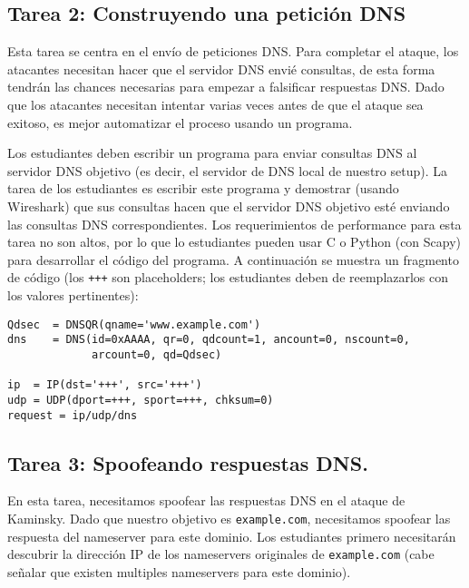 \subsection{Tarea 2: Construyendo una petición DNS} 

Esta tarea se centra en el envío de peticiones DNS.
Para completar el ataque, los atacantes necesitan hacer que el servidor DNS envié consultas, de esta forma tendrán las chances necesarias para empezar a falsificar respuestas DNS. Dado que los atacantes necesitan intentar varias veces antes de que el ataque sea exitoso, es mejor automatizar el proceso usando un programa.

Los estudiantes deben escribir un programa para enviar consultas DNS al servidor DNS objetivo (es decir, el servidor de DNS local de nuestro setup).
La tarea de los estudiantes es escribir este programa y demostrar (usando Wireshark) que sus consultas hacen que el servidor DNS objetivo esté enviando las consultas DNS correspondientes.
Los requerimientos de performance para esta tarea no son altos, por lo que lo estudiantes pueden usar C o Python (con Scapy) para desarrollar el código del programa.
A continuación se muestra un fragmento de código (los \texttt{+++} son placeholders; los estudiantes deben de reemplazarlos con los valores pertinentes):


\begin{lstlisting}
Qdsec  = DNSQR(qname='www.example.com')
dns    = DNS(id=0xAAAA, qr=0, qdcount=1, ancount=0, nscount=0,
             arcount=0, qd=Qdsec)

ip  = IP(dst='+++', src='+++')
udp = UDP(dport=+++, sport=+++, chksum=0)
request = ip/udp/dns
\end{lstlisting}
 


\subsection{Tarea 3: Spoofeando respuestas DNS.}   

En esta tarea, necesitamos spoofear las respuestas DNS en el ataque de Kaminsky.
Dado que nuestro objetivo es  \texttt{example.com}, necesitamos spoofear las respuesta del nameserver para este dominio. Los estudiantes primero necesitarán descubrir la dirección IP de los nameservers originales de  \texttt{example.com} (cabe señalar que existen multiples nameservers para este dominio).

